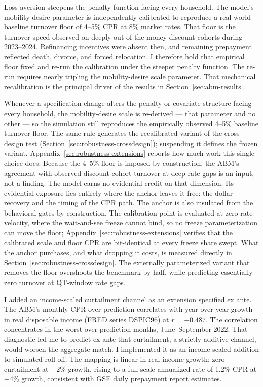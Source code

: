 \documentclass[12pt]{article}
\begin{document}
Loss aversion steepens the penalty function facing every household. The model's mobility-desire parameter is independently calibrated to reproduce a real-world baseline turnover floor of 4--5\% CPR at 8\% market rates. That floor is the turnover speed observed on deeply out-of-the-money discount cohorts during 2023--2024. Refinancing incentives were absent then, and remaining prepayment reflected death, divorce, and forced relocation. I therefore hold that empirical floor fixed and re-run the calibration under the steeper penalty function. The re-run requires nearly tripling the mobility-desire scale parameter. That mechanical recalibration is the principal driver of the results in Section~\ref{sec:abm-results}.

Whenever a specification change alters the penalty or covariate structure facing every household, the mobility-desire scale is re-derived --- that parameter and no other --- so the simulation still reproduces the empirically observed 4--5\% baseline turnover floor. The same rule generates the recalibrated variant of the cross-design test (Section~\ref{sec:robustness-crossdesign}); suspending it defines the frozen variant. Appendix~\ref{sec:robustness-extensions} reports how much work this single choice does. Because the 4--5\% floor is imposed by construction, the ABM's agreement with observed discount-cohort turnover at deep rate gaps is an input, not a finding. The model earns no evidential credit on that dimension. Its evidential exposure lies entirely where the anchor leaves it free: the dollar recovery and the timing of the CPR path. The anchor is also insulated from the behavioral gates by construction. The calibration point is evaluated at zero rate velocity, where the wait-and-see freeze cannot bind, so no freeze parameterization can move the floor; Appendix~\ref{sec:robustness-extensions} verifies that the calibrated scale and floor CPR are bit-identical at every freeze share swept. What the anchor purchases, and what dropping it costs, is measured directly in Section~\ref{sec:robustness-crossdesign}. The externally parameterized variant that removes the floor overshoots the benchmark by half, while predicting essentially zero turnover at QT-window rate gaps.

I added an income-scaled curtailment channel as an extension specified ex ante. The ABM's monthly CPR over-prediction correlates with year-over-year growth in real disposable income (FRED series DSPIC96) at $r = -0.487$. The correlation concentrates in the worst over-prediction months, June--September 2022. That diagnostic led me to predict ex ante that curtailment, a strictly additive channel, would worsen the aggregate match. I implemented it as an income-scaled addition to simulated roll-off. The mapping is linear in real income growth: zero curtailment at $-2$\% growth, rising to a full-scale annualized rate of 1.2\% CPR at +4\% growth, consistent with GSE daily prepayment report estimates.
\end{document}
